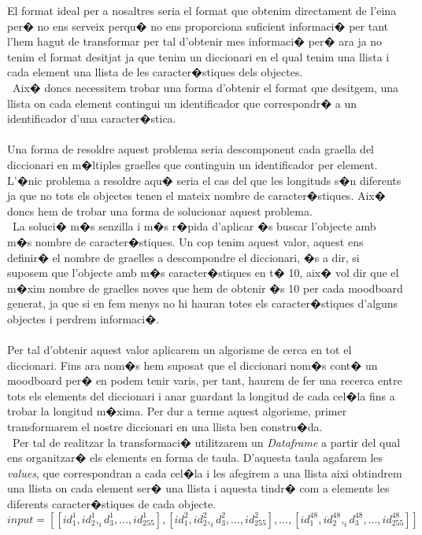 \documentclass[12pt,a4paper,openright,oneside]{article}
\numberwithin{equation}{section}
\theoremstyle{definition}
\begin{document}
El format ideal per a nosaltres seria el format que obtenim directament de l'eina per� no ens serveix perqu� no ens proporciona suficient informaci� per tant l'hem hagut de transformar per tal d'obtenir mes informaci� per� ara ja no tenim el format desitjat ja que tenim un diccionari en el qual tenim una llista i cada element una llista de les caracter�stiques dels objectes.\\\
Aix� doncs necessitem trobar una forma d'obtenir el format que desitgem, una llista on cada element contingui un identificador que correspondr� a un identificador d'una caracter�stica. \\\\
Una forma de resoldre aquest problema seria descomponent cada graella del diccionari en m�ltiples graelles que continguin un identificador per element. 
L'�nic problema a resoldre aqu� seria el cas del que les longituds s�n diferents ja que no tots els objectes tenen el mateix nombre de caracter�stiques. Aix� doncs hem de trobar una forma de solucionar aquest problema. \\\
La soluci� m�s senzilla i m�s r�pida d'aplicar �s buscar l'objecte amb m�s nombre de caracter�stiques. Un cop tenim aquest valor, aquest ens definir� el nombre de graelles a descompondre el diccionari, �s a dir, si suposem que l'objecte amb m�s caracter�stiques en t� 10, aix� vol dir que el m�xim nombre de graelles noves que hem de obtenir �s 10 per cada moodboard generat, ja que si en fem menys no hi hauran totes els caracter�stiques d'alguns objectes i perdrem informaci�.\\\\
Per tal d'obtenir aquest valor aplicarem un algorisme de cerca en tot el diccionari. Fins ara nom�s hem suposat que el diccionari nom�s cont� un moodboard per� en podem tenir varis, per tant, haurem de fer una recerca entre tots els elements del diccionari i anar guardant la longitud de cada cel�la fins a trobar la longitud m�xima. Per dur a terme aquest algorisme, primer transformarem el nostre diccionari en una llista ben constru�da. \\\
Per tal de realitzar la transformaci� utilitzarem un \textit{Dataframe} a partir del qual ens organitzar� els elements en forma de taula. D'aquesta taula agafarem les \textit{values}, que correspondran a cada cel�la i les afegirem a una llista aixi obtindrem una llista on cada element ser� una llista i aquesta tindr� com a elements les diferents caracter�stiques de cada objecte. 
\[input = [[id_1^1,id_2^1,_id_3^1, ...,id_{255}^1], [id_1^2,id_2^2,_id_3^2, ...,id_{255}^2], ..., [id_1^{48},id_2^{48},_id_3^{48}, ...,id_{255}^{48}]]\]
\end{document}
